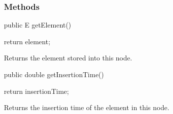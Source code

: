 \subsubsection*{Methods}
\begin{code}

      public E getElement()\begin{hide} { return element; }\end{hide}
\end{code}
\begin{tabbb}  Returns the element stored into this node.
\end{tabbb}
\begin{htmlonly}
\end{htmlonly}
\begin{code}

      public double getInsertionTime()\begin{hide} { return insertionTime; }\end{hide}
\end{code}
\begin{tabbb} Returns the insertion time of the element in this node.
\end{tabbb}
\begin{htmlonly}
\end{htmlonly}
\begin{code}\begin{hide}

      public String toString() {
         String str = element == null ? "null" : element.toString();
         str += " (inserted at time " + insertionTime + ")";
         return str;
      }
   }\end{hide}
\end{code}
\begin{code}\begin{hide}
}\end{hide}
\end{code}
